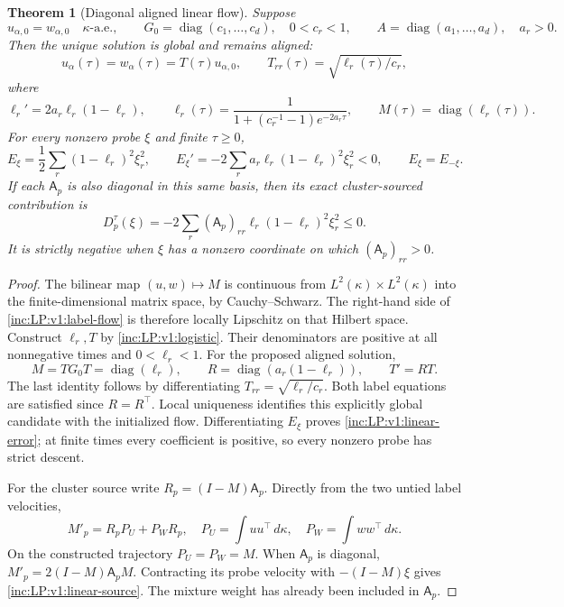 \documentclass[11pt]{article}
\numberwithin{equation}{section}
\newtheorem{theorem}{Theorem}[section]
\theoremstyle{remark}\newtheorem{remark}[theorem]{Remark}
\newcommand{\dd}{\,d}
\DeclareMathOperator{\diag}{diag}
\begin{document}
\begin{theorem}[Diagonal aligned linear flow]
\label{inc:LP:v1:linear-theorem}
Suppose
\[
 u_{\alpha,0}=w_{\alpha,0}\quad\kappa\text{-a.e.},\qquad
 G_0=\diag(c_1,\ldots,c_d),\quad 0<c_r<1,
 \qquad A=\diag(a_1,\ldots,a_d),\quad a_r>0.
\]
Then the unique solution is global and remains aligned:
\[
 u_\alpha(\tau)=w_\alpha(\tau)=T(\tau)u_{\alpha,0},\qquad
 T_{rr}(\tau)=\sqrt{\ell_r(\tau)/c_r},
\]
where
\begin{equation}\label{inc:LP:v1:logistic}
 \ell_r'=2a_r\ell_r(1-\ell_r),\qquad
 \ell_r(\tau)=\frac{1}{1+(c_r^{-1}-1)e^{-2a_r\tau}},
 \qquad M(\tau)=\diag(\ell_r(\tau)).
\end{equation}
For every nonzero probe $\xi$ and finite $\tau\ge0$,
\begin{equation}\label{inc:LP:v1:linear-error}
 E_\xi=\frac12\sum_r(1-\ell_r)^2\xi_r^2,
 \qquad E_\xi'=-2\sum_ra_r\ell_r(1-\ell_r)^2\xi_r^2<0,
 \qquad E_\xi=E_{-\xi}.
\end{equation}
If each $\mathsf A_p$ is also diagonal in this same basis, then its exact
cluster-sourced contribution is
\begin{equation}\label{inc:LP:v1:linear-source}
 D_p^\tau(\xi)
 =-2\sum_r(\mathsf A_p)_{rr}\ell_r(1-\ell_r)^2\xi_r^2\le0.
\end{equation}
It is strictly negative when $\xi$ has a nonzero coordinate on which
$(\mathsf A_p)_{rr}>0$.
\end{theorem}
\begin{proof}
The bilinear map $(u,w)\mapsto M$ is continuous from
$L^2(\kappa)\times L^2(\kappa)$ into the finite-dimensional matrix space,
by Cauchy--Schwarz. The right-hand side of
\eqref{inc:LP:v1:label-flow} is therefore locally Lipschitz on that Hilbert
space. Construct $\ell_r,T$ by \eqref{inc:LP:v1:logistic}. Their denominators
are positive at all nonnegative times and $0<\ell_r<1$. For the proposed
aligned solution,
\[
 M=TG_0T=\diag(\ell_r),\qquad
 R=\diag(a_r(1-\ell_r)),\qquad T'=RT.
\]
The last identity follows by differentiating
$T_{rr}=\sqrt{\ell_r/c_r}$. Both label equations are satisfied since
$R=R^\top$. Local uniqueness identifies this explicitly global candidate
with the initialized flow. Differentiating $E_\xi$ proves
\eqref{inc:LP:v1:linear-error}; at finite times every coefficient is
positive, so every nonzero probe has strict descent.

For the cluster source write $R_p=(I-M)\mathsf A_p$. Directly
from the two untied label velocities,
\begin{equation}\label{inc:LP:v1:source-matrix}
 M'_p=R_pP_U+P_WR_p,\quad
 P_U=\int uu^\top\dd\kappa,\quad P_W=\int ww^\top\dd\kappa.
\end{equation}
On the constructed trajectory $P_U=P_W=M$. When $\mathsf A_p$ is diagonal,
$M'_p=2(I-M)\mathsf A_pM$. Contracting its probe velocity with
$-(I-M)\xi$ gives \eqref{inc:LP:v1:linear-source}. The mixture weight has
already been included in $\mathsf A_p$.
\end{proof}
\end{document}
